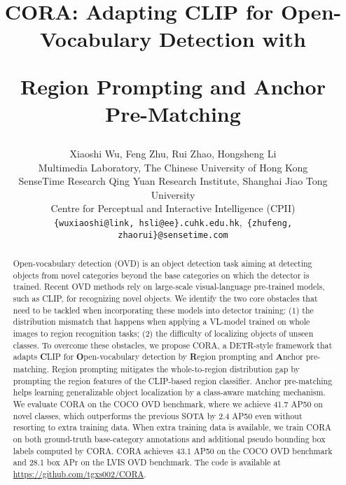 \documentclass[10pt,twocolumn,letterpaper]{article}
\begin{document}
\title{CORA: Adapting CLIP for Open-Vocabulary Detection with 

Region Prompting and Anchor Pre-Matching}



\author{
    Xiaoshi Wu, 
    Feng Zhu, 
    Rui Zhao, 
    Hongsheng Li
\vspace{0.1em}\\
    Multimedia Laboratory, The Chinese University of Hong Kong \\
    SenseTime Research \quad Qing Yuan Research Institute, Shanghai Jiao Tong University \\
    Centre for Perceptual and Interactive Intelligence (CPII) \\ 
    \texttt{\small \{wuxiaoshi@link, hsli@ee\}.cuhk.edu.hk},~\texttt{\small \{zhufeng, zhaorui\}@sensetime.com}
}

\maketitle

\begin{abstract}
   Open-vocabulary detection (OVD) is an object detection task aiming at detecting objects from novel categories beyond the base categories on which the detector is trained.
   Recent OVD methods rely on large-scale visual-language pre-trained models, such as CLIP,  for recognizing novel objects.
   We identify the two core obstacles that need to be tackled when incorporating these models into detector training:
   (1) the distribution mismatch that happens when applying a VL-model trained on whole images to region recognition tasks;
   (2) the difficulty of localizing objects of unseen classes.
   To overcome these obstacles, we propose CORA, a DETR-style framework that adapts \textbf{C}LIP for \textbf{O}pen-vocabulary detection by \textbf{R}egion prompting and \textbf{A}nchor pre-matching.
   Region prompting mitigates the whole-to-region distribution gap by prompting the region features of the CLIP-based region classifier.
   Anchor pre-matching helps learning generalizable object localization by a class-aware matching mechanism.   
We evaluate CORA on the COCO OVD benchmark, where we achieve 41.7 AP50 on novel classes, which outperforms the previous SOTA by 2.4 AP50 even without resorting to extra training data.
   When extra training data is available, we train CORA on both ground-truth base-category annotations and additional pseudo bounding box labels computed by CORA.  
   CORA achieves 43.1 AP50 on the COCO OVD benchmark and 28.1 box APr on the LVIS OVD benchmark.
   The code is available at \href{https://github.com/tgxs002/CORA}{https://github.com/tgxs002/CORA}.
\end{abstract}
\end{document}
